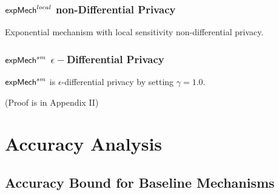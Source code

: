 \documentclass{article}
\begin{document}
\subsubsection{$\mathsf{expMech}^{local}$ non-Differential Privacy}
Exponential mechanism with local sensitivity non-differential privacy.

\subsubsection{$\mathsf{expMech}^{sm}$ $\epsilon-$Differential Privacy}

\begin{lem}
\label{lem_hexpmech_privacy}
$\mathsf{expMech}^{sm}$ is $\epsilon$-differential privacy by setting $\gamma = 1.0$.
\end{lem}
(Proof is in Appendix II)



\section{Accuracy Analysis}

\subsection{Accuracy Bound for Baseline Mechanisms}

\end{document}
